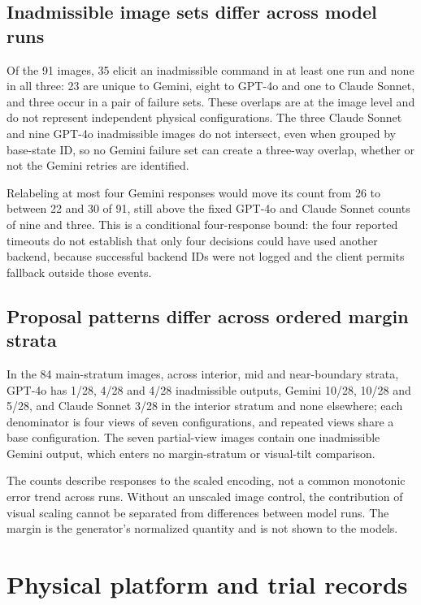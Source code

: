 \documentclass[10pt]{article}
\begin{document}
\subsection{Inadmissible image sets differ across model runs}

Of the 91 images, 35 elicit an inadmissible command in at least one run and
none in all three: 23 are unique to Gemini, eight to GPT-4o and one to Claude
Sonnet, and three occur in a pair of failure sets. These overlaps are at the image level and do not represent independent physical configurations. The three Claude Sonnet and
nine GPT-4o inadmissible images do not intersect, even when grouped by
base-state ID, so no Gemini failure set can create a three-way overlap,
whether or not the Gemini retries are identified.

Relabeling at most four Gemini responses would move its count from 26 to
between 22 and 30 of 91, still above the fixed GPT-4o and Claude Sonnet counts
of nine and three. This is a conditional four-response bound:
the four reported timeouts do not establish that only four decisions could
have used another backend, because successful backend IDs were not logged and
the client permits fallback outside those events.

\subsection{Proposal patterns differ across ordered margin strata}

In the 84 main-stratum images, across interior, mid and near-boundary
strata, GPT-4o has 1/28, 4/28 and 4/28 inadmissible outputs, Gemini 10/28,
10/28 and 5/28, and Claude Sonnet 3/28 in the interior stratum and none
elsewhere; each denominator is four views of seven configurations, and
repeated views share a base configuration. The seven partial-view images
contain one inadmissible Gemini output, which enters no margin-stratum or
visual-tilt comparison.

The counts describe responses to the scaled encoding, not a common monotonic
error trend across runs. Without an unscaled image control, the contribution of
visual scaling cannot be separated from differences between model runs. The
margin is the generator's normalized quantity and is not shown to the models.


\section{Physical platform and trial records}
\end{document}
